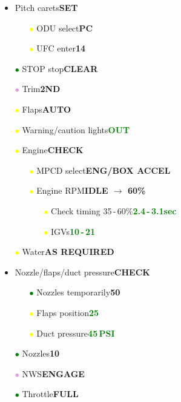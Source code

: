 \documentclass[a4paper,12pt,dvipsnames]{letter}
\newcommand{\button}[1]{\textbf{#1}}
\newcommand{\Deg}{\textdegree{}}
\newcommand{\ok}[1]{\textcolor{Green}{\textbf{#1}}}
\newcommand{\gi}{\textcolor{Green}{$\bullet$\;}}
\newcommand{\yi}{\textcolor{Yellow}{$\bullet$\;}}
\newcommand{\vi}{\textcolor{Plum}{$\bullet$\;}}
\begin{document}
{\begin{itemize}
\item Pitch carets\dotfill\button{SET}
\begin{itemize}
 \item[\yi] ODU select\dotfill\button{PC}
 \item[\yi] UFC enter\dotfill\button{14}
\end{itemize}
\item[\gi] STOP stop\dotfill\button{CLEAR}
\item[\vi] Trim\dotfill\button{2\Deg\;ND}
\item[\yi] Flaps\dotfill\button{AUTO}
\item[\yi] Warning/caution lights\dotfill\ok{OUT}
\item[\yi] Engine\dotfill\button{CHECK}
\begin{itemize}
 \item[\yi] MPCD select\dotfill\button{ENG/BOX ACCEL}
 \item[\yi] Engine RPM\dotfill\button{IDLE $\rightarrow$ 60\%}
 \begin{itemize}
  \item[\yi] Check timing 35\,-\,60\%\dotfill\ok{2.4\,-\,3.1\;sec}
  \item[\yi] IGVs\dotfill\ok{10\Deg\,-\,21\Deg}	
 \end{itemize}
\end{itemize}
\item[\yi] Water\dotfill\button{AS REQUIRED}
\item Nozzle/flaps/duct pressure\dotfill\button{CHECK}
\begin{itemize}
 \item[\gi] Nozzles temporarily\dotfill\button{50\Deg}
 \item[\yi] Flaps position\dotfill\ok{25\Deg}
 \item[\yi] Duct pressure\dotfill\ok{45\,PSI}
\end{itemize}
\item[\gi] Nozzles\dotfill\button{10\textdegree}
\item[\vi] NWS\dotfill\button{ENGAGE}
\item[\gi] Throttle\dotfill\button{FULL}

\end{itemize}}
\end{document}
